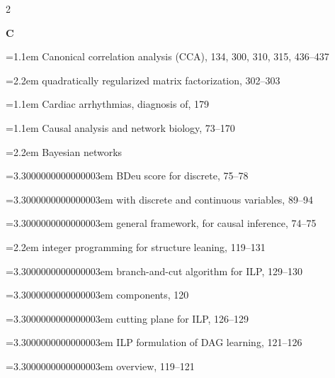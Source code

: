 \begin{multicols}{2}
\par{}\medskip\noindent\textbf{C}\par\nobreak\smallskip\nobreak
\noindent\hangindent=1.1em Canonical correlation analysis (CCA), 134, 300, 310, 315, 436--437\par
\noindent\hangindent=2.2em \hspace*{1.1em}quadratically regularized matrix factorization, 302--303\par
\noindent\hangindent=1.1em Cardiac arrhythmias, diagnosis of, 179\par
\noindent\hangindent=1.1em Causal analysis and network biology, 73--170\par
\noindent\hangindent=2.2em \hspace*{1.1em}Bayesian networks\par
\noindent\hangindent=3.3000000000000003em \hspace*{2.2em}BDeu score for discrete, 75--78\par
\noindent\hangindent=3.3000000000000003em \hspace*{2.2em}with discrete and continuous variables, 89--94\par
\noindent\hangindent=3.3000000000000003em \hspace*{2.2em}general framework, for causal inference, 74--75\par
\noindent\hangindent=2.2em \hspace*{1.1em}integer programming for structure leaning, 119--131\par
\noindent\hangindent=3.3000000000000003em \hspace*{2.2em}branch-and-cut algorithm for ILP, 129--130\par
\noindent\hangindent=3.3000000000000003em \hspace*{2.2em}components, 120\par
\noindent\hangindent=3.3000000000000003em \hspace*{2.2em}cutting plane for ILP, 126--129\par
\noindent\hangindent=3.3000000000000003em \hspace*{2.2em}ILP formulation of DAG learning, 121--126\par
\noindent\hangindent=3.3000000000000003em \hspace*{2.2em}overview, 119--121\par

\end{multicols}
